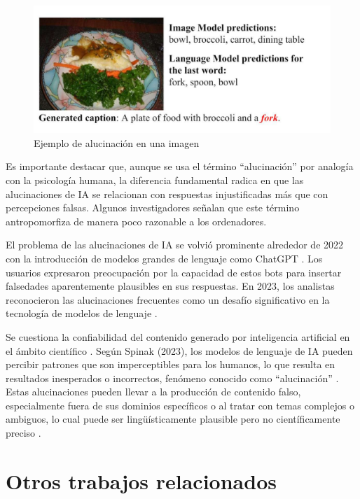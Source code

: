 \begin{figure}[h]
	\centering
	\includegraphics[scale=0.6]{Imagenes/alucinacionImagenes}
	\caption{Ejemplo de alucinación en una imagen \cite{rohrbach2023object}}
	\label{img:alucinacion2}
\end{figure}
Es importante destacar que, aunque se usa el término ``alucinación'' por analogía con la psicología humana, la diferencia fundamental radica en que las alucinaciones de IA se relacionan con respuestas injustificadas más que con percepciones falsas. Algunos investigadores señalan que este término antropomorfiza de manera poco razonable a los ordenadores.

El problema de las alucinaciones de IA se volvió prominente alrededor de 2022 con la introducción de modelos grandes de lenguaje como ChatGPT \cite{zhuo2023exploring}. Los usuarios expresaron preocupación por la capacidad de estos bots para insertar falsedades aparentemente plausibles en sus respuestas. En 2023, los analistas reconocieron las alucinaciones frecuentes como un desafío significativo en la tecnología de modelos de lenguaje \cite{leswing2023microsoft}.

Se cuestiona la confiabilidad del contenido generado por inteligencia artificial en el ámbito científico \cite{machinmastromatteo2023implicaciones}. Según Spinak (2023), los modelos de lenguaje de IA pueden percibir patrones que son imperceptibles para los humanos, lo que resulta en resultados inesperados o incorrectos, fenómeno conocido como ``alucinación'' \cite{spinak2023alucinaciones}. Estas alucinaciones pueden llevar a la producción de contenido falso, especialmente fuera de sus dominios específicos o al tratar con temas complejos o ambiguos, lo cual puede ser lingüísticamente plausible pero no científicamente preciso \cite{sage2023chatgpt}.

\section{Otros trabajos relacionados}
